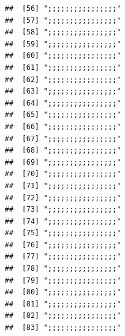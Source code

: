 \documentclass[
]{article}
\begin{document}
\begin{verbatim}
##  [56] ";;;;;;;;;;;;;;;;"                                                                    
##  [57] ";;;;;;;;;;;;;;;;"                                                                    
##  [58] ";;;;;;;;;;;;;;;;"                                                                    
##  [59] ";;;;;;;;;;;;;;;;"                                                                    
##  [60] ";;;;;;;;;;;;;;;;"                                                                    
##  [61] ";;;;;;;;;;;;;;;;"                                                                    
##  [62] ";;;;;;;;;;;;;;;;"                                                                    
##  [63] ";;;;;;;;;;;;;;;;"                                                                    
##  [64] ";;;;;;;;;;;;;;;;"                                                                    
##  [65] ";;;;;;;;;;;;;;;;"                                                                    
##  [66] ";;;;;;;;;;;;;;;;"                                                                    
##  [67] ";;;;;;;;;;;;;;;;"                                                                    
##  [68] ";;;;;;;;;;;;;;;;"                                                                    
##  [69] ";;;;;;;;;;;;;;;;"                                                                    
##  [70] ";;;;;;;;;;;;;;;;"                                                                    
##  [71] ";;;;;;;;;;;;;;;;"                                                                    
##  [72] ";;;;;;;;;;;;;;;;"                                                                    
##  [73] ";;;;;;;;;;;;;;;;"                                                                    
##  [74] ";;;;;;;;;;;;;;;;"                                                                    
##  [75] ";;;;;;;;;;;;;;;;"                                                                    
##  [76] ";;;;;;;;;;;;;;;;"                                                                    
##  [77] ";;;;;;;;;;;;;;;;"                                                                    
##  [78] ";;;;;;;;;;;;;;;;"                                                                    
##  [79] ";;;;;;;;;;;;;;;;"                                                                    
##  [80] ";;;;;;;;;;;;;;;;"                                                                    
##  [81] ";;;;;;;;;;;;;;;;"                                                                    
##  [82] ";;;;;;;;;;;;;;;;"                                                                    
##  [83] ";;;;;;;;;;;;;;;;"                                                                    

\end{verbatim}
\end{document}
